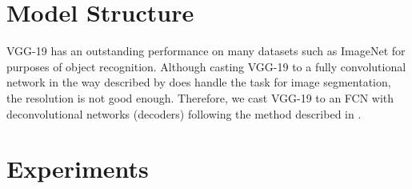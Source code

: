 \documentclass[10pt,twocolumn,letterpaper]{article}
\begin{document}
\section{Model Structure}
VGG-19 has an outstanding performance on many datasets such as ImageNet for purposes of object recognition. Although casting VGG-19 \cite{Simonyan14c} to a fully convolutional network in the way described by \cite{Long_2015_CVPR} does handle the task for image segmentation, the resolution is not good enough. Therefore, we cast VGG-19 to an FCN with deconvolutional networks (decoders) following the method described in \cite{badrinarayanan2015segnet2}.


\section{Experiments}

{\small


}
\end{document}
